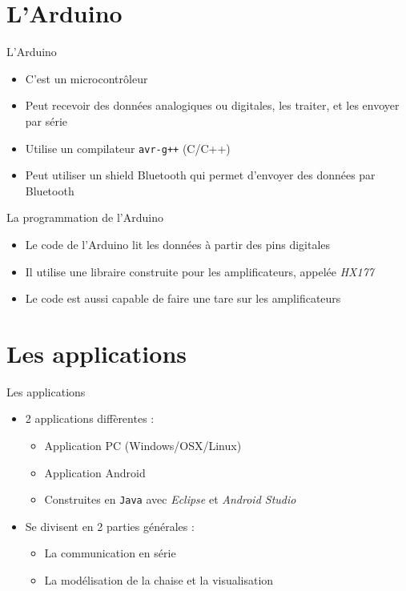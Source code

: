 \documentclass{beamer}
\begin{document}
\section{L'Arduino}
\begin{frame}
\begin{block}{L'Arduino}
\pause
\begin{itemize}
\item C'est un microcontrôleur
\pause
\item Peut recevoir des données analogiques ou digitales, les traiter, et les envoyer par série
\pause
\item Utilise un compilateur \texttt{avr-g++} (C/C++)
\pause
\item Peut utiliser un shield Bluetooth qui permet d'envoyer des données par Bluetooth
\end{itemize}
\end{block}
\end{frame}

\begin{frame}
\begin{block}{La programmation de l'Arduino}
\pause
\begin{itemize}
\item Le code de l'Arduino lit les données à partir des pins digitales
\pause
\item Il utilise une libraire construite pour les amplificateurs, appelée \textit{HX177} \cite{hx711}
\pause
\item Le code est aussi capable de faire une tare sur les amplificateurs
\end{itemize}
\end{block}
\end{frame}

\section{Les applications}
\begin{frame}
\begin{block}{Les applications}
\pause
\begin{itemize}
\item 2 applications diffèrentes :
\pause
\begin{itemize}
\item Application PC (Windows/OSX/Linux)
\pause
\item Application Android
\pause
\item Construites en \texttt{Java} avec \textit{Eclipse} et \textit{Android Studio}
\end{itemize}
\item Se divisent en 2 parties générales :
\pause
\begin{itemize}
\item La communication en série
\pause
\item La modélisation de la chaise et la visualisation
\end{itemize}
\end{itemize}
\end{block}
\end{frame}
\end{document}
